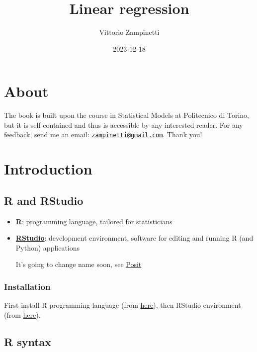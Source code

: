 \documentclass[
  oneside]{book}
\title{Linear regression}
\author{Vittorio Zampinetti}
\date{2023-12-18}
\begin{document}
\maketitle

{
\setcounter{tocdepth}{2}
\tableofcontents
}
\hypertarget{about}{%
\chapter*{About}\label{about}}

The book is built upon the course in Statistical Models at
Politecnico di Torino, but it is self-contained and thus is
accessible by any interested reader. For any feedback, send me
an email: \href{mailto:zampinetti@gmail.com}{\nolinkurl{zampinetti@gmail.com}}. Thank you!

\hypertarget{introduction}{%
\chapter{Introduction}\label{introduction}}

\hypertarget{r-and-rstudio}{%
\section{R and RStudio}\label{r-and-rstudio}}

\begin{itemize}
\item
  \href{https://www.r-project.org/}{\textbf{R}}: programming language, tailored for
  statisticians
\item
  \href{https://www.rstudio.com/}{\textbf{RStudio}}: development environment, software for
  editing and running R (and Python) applications

  It's going to change name soon, see \href{https://posit.co/}{Posit}
\end{itemize}

\hypertarget{installation}{%
\subsection{Installation}\label{installation}}

First install R programming language (from \href{https://cran.rstudio.com/}{here}),
then RStudio environment (from
\href{https://www.rstudio.com/products/rstudio/download/\#download}{here}).

\hypertarget{r-syntax}{%
\section{R syntax}\label{r-syntax}}
\end{document}
